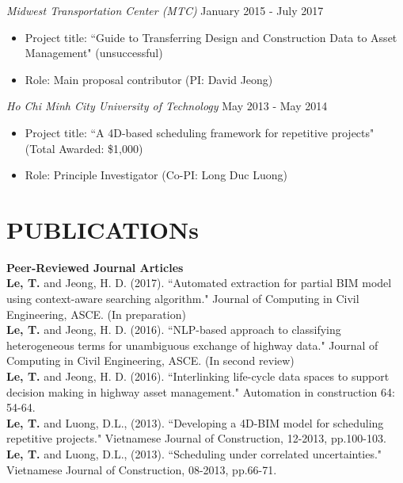 \documentclass[11pt]{res}
\begin{document}
\begin{resume}
{\sl Midwest Transportation Center (MTC)} \hfill January 2015 - July 2017
\begin{itemize} 
\item Project title: ``Guide to Transferring Design and Construction Data to Asset Management" (unsuccessful)
\item Role: Main proposal contributor (PI: David Jeong)
\end{itemize}

{\sl Ho Chi Minh City University of Technology } \hfill May 2013 - May 2014
\begin{itemize}
\item Project title: ``A 4D-based scheduling framework for repetitive projects" (Total Awarded: \$1,000)
\item Role: Principle Investigator (Co-PI: Long Duc Luong)
\end{itemize}


\section{PUBLICATIONs}

{\bf Peer-Reviewed Journal Articles}\\
{\bf Le, T.} and Jeong, H. D. (2017). ``Automated extraction for partial BIM model using context-aware searching algorithm." Journal of Computing in Civil Engineering, ASCE. (In preparation)\\
{\bf Le, T.} and Jeong, H. D. (2016). ``NLP-based approach to classifying heterogeneous terms for unambiguous exchange of highway data." Journal of Computing in Civil Engineering, ASCE. (In second review)\\
{\bf Le, T.} and Jeong, H. D. (2016). ``Interlinking life-cycle data spaces to support decision making in highway asset management." Automation in construction 64: 54-64.\\
{\bf Le, T.} and Luong, D.L., (2013). ``Developing a 4D-BIM model for scheduling repetitive projects." Vietnamese Journal of Construction, 12-2013, pp.100-103.\\
{\bf Le, T.} and Luong, D.L., (2013). ``Scheduling under correlated uncertainties." Vietnamese Journal of Construction, 08-2013, pp.66-71.


\end{resume}
\end{document}
